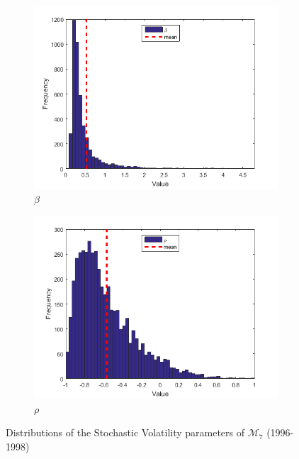 \documentclass[11pt,a4,twosided,singlespacing,titlepagenumber=on]{scrreprt}
\numberwithin{equation}{chapter} %
\theoremstyle{remark}
\begin{document}
\begin{figure}[H]
\begin{subfigure}[t]{0.32\textwidth}
        \includegraphics[width=1\textwidth]{res/params/2192_2923/5}
        \caption{$\beta$}
    \end{subfigure}
    \begin{subfigure}[t]{0.32\textwidth}
        \centering
        \includegraphics[width=1\textwidth]{res/params/2192_2923/6}
        \caption{$\rho$}
    \end{subfigure}
    \caption[]{Distributions of the Stochastic Volatility parameters of $\mathcal{M}_7$ (1996-1998)}
    \label{fig:param_dists_2000_2002}
\end{figure}
\end{document}
